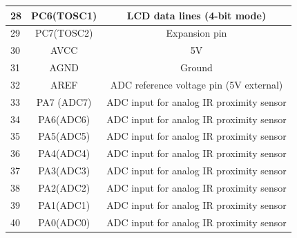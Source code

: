 \documentclass[a4paper,12pt,oneside]{book}
\begin{document}
\begin{tabular*}{\textwidth}{|l|c|c|}
	\hline
	28 & PC6(TOSC1) & LCD data lines (4-bit mode) \\
	\hline
	29 & PC7(TOSC2) & Expansion pin \\
	\hline
	30 & AVCC & 5V \\
	\hline
	31 & AGND & Ground \\
	\hline
	32 & AREF & ADC reference voltage pin (5V external) \\
	\hline
	33 & PA7 (ADC7) & ADC input for analog IR proximity sensor\\
	\hline
	34 & PA6(ADC6) & ADC input for analog IR proximity sensor\\
	\hline
	35 & PA5(ADC5) & ADC input for analog IR proximity sensor\\
	\hline
	36 & PA4(ADC4) & ADC input for analog IR proximity sensor\\
	\hline
	37 & PA3(ADC3) & ADC input for analog IR proximity sensor\\
	\hline
	38 & PA2(ADC2) & ADC input for analog IR proximity sensor\\
	\hline
	39 & PA1(ADC1) & ADC input for analog IR proximity sensor\\
	\hline
	40 & PA0(ADC0) & ADC input for analog IR proximity sensor\\
	\hline
\end{tabular*}
\end{document}
